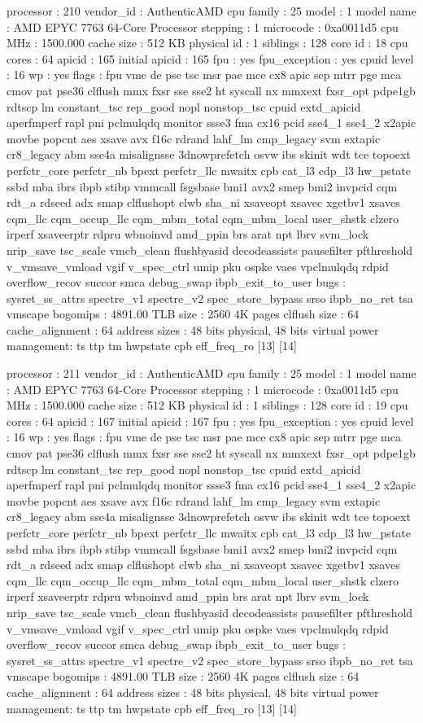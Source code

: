 processor	: 210
vendor_id	: AuthenticAMD
cpu family	: 25
model		: 1
model name	: AMD EPYC 7763 64-Core Processor
stepping	: 1
microcode	: 0xa0011d5
cpu MHz		: 1500.000
cache size	: 512 KB
physical id	: 1
siblings	: 128
core id		: 18
cpu cores	: 64
apicid		: 165
initial apicid	: 165
fpu		: yes
fpu_exception	: yes
cpuid level	: 16
wp		: yes
flags		: fpu vme de pse tsc msr pae mce cx8 apic sep mtrr pge mca cmov pat pse36 clflush mmx fxsr sse sse2 ht syscall nx mmxext fxsr_opt pdpe1gb rdtscp lm constant_tsc rep_good nopl nonstop_tsc cpuid extd_apicid aperfmperf rapl pni pclmulqdq monitor ssse3 fma cx16 pcid sse4_1 sse4_2 x2apic movbe popcnt aes xsave avx f16c rdrand lahf_lm cmp_legacy svm extapic cr8_legacy abm sse4a misalignsse 3dnowprefetch osvw ibs skinit wdt tce topoext perfctr_core perfctr_nb bpext perfctr_llc mwaitx cpb cat_l3 cdp_l3 hw_pstate ssbd mba ibrs ibpb stibp vmmcall fsgsbase bmi1 avx2 smep bmi2 invpcid cqm rdt_a rdseed adx smap clflushopt clwb sha_ni xsaveopt xsavec xgetbv1 xsaves cqm_llc cqm_occup_llc cqm_mbm_total cqm_mbm_local user_shstk clzero irperf xsaveerptr rdpru wbnoinvd amd_ppin brs arat npt lbrv svm_lock nrip_save tsc_scale vmcb_clean flushbyasid decodeassists pausefilter pfthreshold v_vmsave_vmload vgif v_spec_ctrl umip pku ospke vaes vpclmulqdq rdpid overflow_recov succor smca debug_swap ibpb_exit_to_user
bugs		: sysret_ss_attrs spectre_v1 spectre_v2 spec_store_bypass srso ibpb_no_ret tsa vmscape
bogomips	: 4891.00
TLB size	: 2560 4K pages
clflush size	: 64
cache_alignment	: 64
address sizes	: 48 bits physical, 48 bits virtual
power management: ts ttp tm hwpstate cpb eff_freq_ro [13] [14]

processor	: 211
vendor_id	: AuthenticAMD
cpu family	: 25
model		: 1
model name	: AMD EPYC 7763 64-Core Processor
stepping	: 1
microcode	: 0xa0011d5
cpu MHz		: 1500.000
cache size	: 512 KB
physical id	: 1
siblings	: 128
core id		: 19
cpu cores	: 64
apicid		: 167
initial apicid	: 167
fpu		: yes
fpu_exception	: yes
cpuid level	: 16
wp		: yes
flags		: fpu vme de pse tsc msr pae mce cx8 apic sep mtrr pge mca cmov pat pse36 clflush mmx fxsr sse sse2 ht syscall nx mmxext fxsr_opt pdpe1gb rdtscp lm constant_tsc rep_good nopl nonstop_tsc cpuid extd_apicid aperfmperf rapl pni pclmulqdq monitor ssse3 fma cx16 pcid sse4_1 sse4_2 x2apic movbe popcnt aes xsave avx f16c rdrand lahf_lm cmp_legacy svm extapic cr8_legacy abm sse4a misalignsse 3dnowprefetch osvw ibs skinit wdt tce topoext perfctr_core perfctr_nb bpext perfctr_llc mwaitx cpb cat_l3 cdp_l3 hw_pstate ssbd mba ibrs ibpb stibp vmmcall fsgsbase bmi1 avx2 smep bmi2 invpcid cqm rdt_a rdseed adx smap clflushopt clwb sha_ni xsaveopt xsavec xgetbv1 xsaves cqm_llc cqm_occup_llc cqm_mbm_total cqm_mbm_local user_shstk clzero irperf xsaveerptr rdpru wbnoinvd amd_ppin brs arat npt lbrv svm_lock nrip_save tsc_scale vmcb_clean flushbyasid decodeassists pausefilter pfthreshold v_vmsave_vmload vgif v_spec_ctrl umip pku ospke vaes vpclmulqdq rdpid overflow_recov succor smca debug_swap ibpb_exit_to_user
bugs		: sysret_ss_attrs spectre_v1 spectre_v2 spec_store_bypass srso ibpb_no_ret tsa vmscape
bogomips	: 4891.00
TLB size	: 2560 4K pages
clflush size	: 64
cache_alignment	: 64
address sizes	: 48 bits physical, 48 bits virtual
power management: ts ttp tm hwpstate cpb eff_freq_ro [13] [14]


